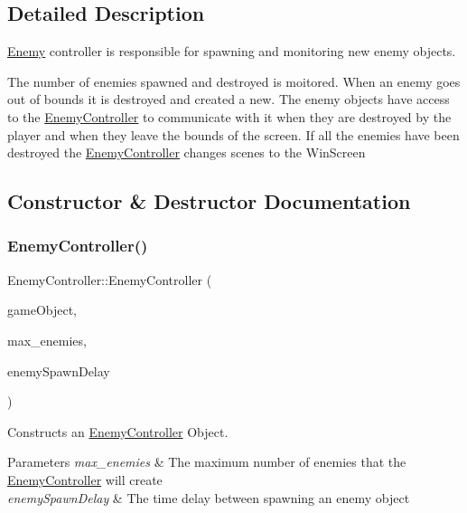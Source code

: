 \subsection{Detailed Description}
\hyperlink{class_enemy}{Enemy} controller is responsible for spawning and monitoring new enemy objects. 

The number of enemies spawned and destroyed is moitored. When an enemy goes out of bounds it is destroyed and created a new. The enemy objects have access to the \hyperlink{class_enemy_controller}{Enemy\+Controller} to communicate with it when they are destroyed by the player and when they leave the bounds of the screen. If all the enemies have been destroyed the \hyperlink{class_enemy_controller}{Enemy\+Controller} changes scenes to the Win\+Screen 

\subsection{Constructor \& Destructor Documentation}
\mbox{\label{class_enemy_controller_a07159de6348f511017c5415371459d50}} 
\subsubsection{\texorpdfstring{Enemy\+Controller()}{EnemyController()}}
{\footnotesize\ttfamily Enemy\+Controller\+::\+Enemy\+Controller (\begin{DoxyParamCaption}\item[{const \hyperlink{class_game_object}{Game\+Object} \&}]{game\+Object,  }\item[{unsigned int}]{max\+\_\+enemies,  }\item[{double}]{enemy\+Spawn\+Delay }\end{DoxyParamCaption})}



Constructs an \hyperlink{class_enemy_controller}{Enemy\+Controller} Object. 


\begin{DoxyParams}{Parameters}
{\em max\+\_\+enemies} & The maximum number of enemies that the \hyperlink{class_enemy_controller}{Enemy\+Controller} will create \\
\hline
{\em enemy\+Spawn\+Delay} & The time delay between spawning an enemy object \\
\hline
\end{DoxyParams}


